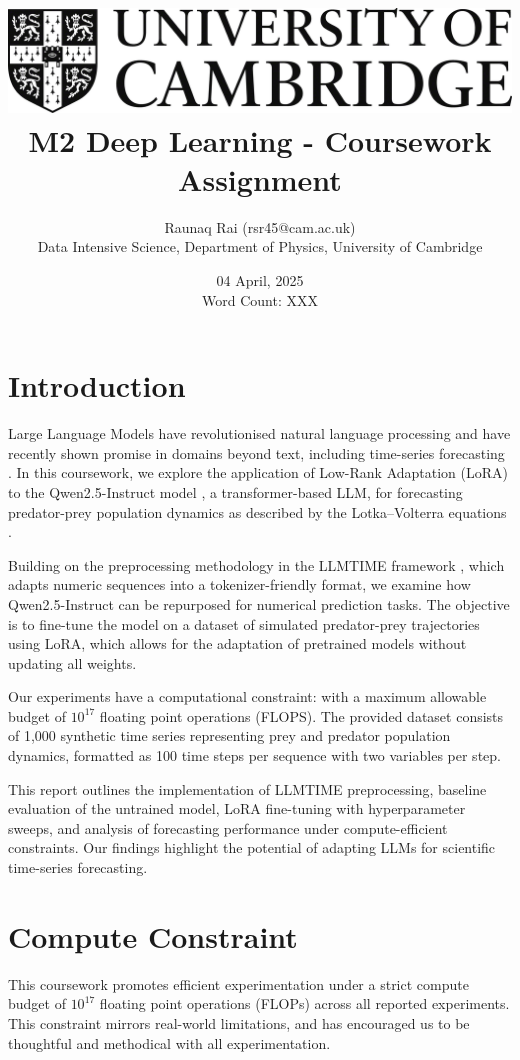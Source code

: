 \documentclass[a4paper,12pt]{article}
\title{
    \includegraphics[scale=0.4]{Cam_logo_bw.png}\\
    \vspace{0.5cm}
    M2 Deep Learning - Coursework Assignment
}
\author{Raunaq Rai (rsr45@cam.ac.uk)\\
    Data Intensive Science, Department of Physics, University of Cambridge
}
\date{04 April, 2025 \\ \vspace{0.2cm} {\small Word Count: XXX}}
\begin{document}
\maketitle

\section*{Introduction}

Large Language Models have revolutionised natural language processing and have recently shown promise in domains beyond text, including time-series forecasting \citep{gruver2023language}. In this coursework, we explore the application of Low-Rank Adaptation (LoRA) \citep{hu2021lora} to the Qwen2.5-Instruct model \citep{qwen2.5}, a transformer-based LLM, for forecasting predator-prey population dynamics as described by the Lotka–Volterra equations \citep{takeuchi2006lotka}.

Building on the preprocessing methodology in the LLMTIME framework \citep{gruver2023language}, which adapts numeric sequences into a tokenizer-friendly format, we examine how Qwen2.5-Instruct can be repurposed for numerical prediction tasks. The objective is to fine-tune the model on a dataset of simulated predator-prey trajectories using LoRA, which allows for the adaptation of pretrained models without updating all weights.

Our experiments have a computational constraint: with a maximum allowable budget of $10^{17}$ floating point operations (FLOPS). The provided dataset consists of 1,000 synthetic time series representing prey and predator population dynamics, formatted as 100 time steps per sequence with two variables per step.

This report outlines the implementation of LLMTIME preprocessing, baseline evaluation of the untrained model, LoRA fine-tuning with hyperparameter sweeps, and analysis of forecasting performance under compute-efficient constraints. Our findings highlight the potential of adapting LLMs for scientific time-series forecasting.

\section{Compute Constraint}

This coursework promotes efficient experimentation under a strict compute budget of $10^{17}$ floating point operations (FLOPs) across all reported experiments. This constraint mirrors real-world limitations, and has encouraged us to be thoughtful and methodical with all experimentation.
\end{document}
